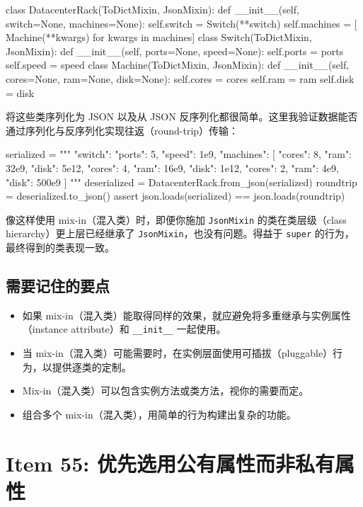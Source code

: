 \begin{codebox}[python]
class DatacenterRack(ToDictMixin, JsonMixin):
    def __init__(self, switch=None, machines=None):
        self.switch = Switch(**switch)
        self.machines = [
            Machine(**kwargs) for kwargs in machines]
class Switch(ToDictMixin, JsonMixin):
    def __init__(self, ports=None, speed=None):
        self.ports = ports
        self.speed = speed
class Machine(ToDictMixin, JsonMixin):
    def __init__(self, cores=None, ram=None, disk=None):
        self.cores = cores
        self.ram = ram
        self.disk = disk
\end{codebox}

将这些类序列化为 JSON 以及从 JSON 反序列化都很简单。这里我验证数据能否通过序列化与反序列化实现往返（round-trip）传输：

\begin{codebox}[python]
serialized = """{
    "switch": {"ports": 5, "speed": 1e9},
    "machines": [
        {"cores": 8, "ram": 32e9, "disk": 5e12},
        {"cores": 4, "ram": 16e9, "disk": 1e12},
        {"cores": 2, "ram": 4e9, "disk": 500e9}
    ]
}"""
deserialized = DatacenterRack.from_json(serialized)
roundtrip = deserialized.to_json()
assert json.loads(serialized) == json.loads(roundtrip)
\end{codebox}

像这样使用 mix-in（混入类）时，即便你施加 \texttt{JsonMixin} 的类在类层级（class hierarchy）更上层已经继承了 \texttt{JsonMixin}，也没有问题。得益于 \texttt{super} 的行为，最终得到的类表现一致。

\subsection{需要记住的要点}

\begin{itemize}
\item 如果 mix-in（混入类）能取得同样的效果，就应避免将多重继承与实例属性（instance attribute）和 \texttt{\_\_init\_\_} 一起使用。
\item 当 mix-in（混入类）可能需要时，在实例层面使用可插拔（pluggable）行为，以提供逐类的定制。
\item Mix-in（混入类）可以包含实例方法或类方法，视你的需要而定。
\item 组合多个 mix-in（混入类），用简单的行为构建出复杂的功能。
\end{itemize}

\section{Item 55: 优先选用公有属性而非私有属性}

